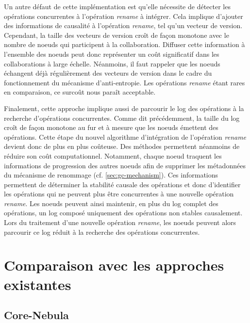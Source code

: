 \documentclass[12pt]{thesul}
\begin{document}
Un autre défaut de cette implémentation est qu'elle nécessite de détecter les opérations concurrentes à l'opération \emph{rename} à intégrer.
Cela implique d'ajouter des informations de causalité à l'opération \emph{rename}, tel qu'un vecteur de version.
Cependant, la taille des vecteurs de version croît de façon monotone avec le nombre de noeuds qui participent à la collaboration.
Diffuser cette information à l'ensemble des noeuds peut donc représenter un coût significatif dans les collaborations à large échelle.
Néanmoins, il faut rappeler que les noeuds échangent déjà régulièrement des vecteurs de version dans le cadre du fonctionnement du mécanisme d'anti-entropie.
Les opérations \emph{rename} étant rares en comparaison, ce surcoût nous paraît acceptable.

Finalement, cette approche implique aussi de parcourir le log des opérations à la recherche d'opérations concurrentes.
Comme dit précédemment, la taille du log croît de façon monotone au fur et à mesure que les noeuds émettent des opérations.
Cette étape du nouvel algorithme d'intégration de l'opération \emph{rename} devient donc de plus en plus coûteuse.
Des méthodes permettent néanmoins de réduire son coût computationnel.
Notamment, chaque noeud traquent les informations de progression des autres noeuds afin de supprimer les métadonnées du mécanisme de renommage (cf. \autoref{sec:gc-mechanism}).
Ces informations permettent de déterminer la stabilité causale des opérations et donc d'identifier les opérations qui ne peuvent plus être concurrentes à une nouvelle opération \emph{rename}.
Les noeuds peuvent ainsi maintenir, en plus du log complet des opérations, un log composé uniquement des opérations non stables causalement.
Lors du traitement d'une nouvelle opération \emph{rename}, les noeuds peuvent alors parcourir ce log réduit à la recherche des opérations concurrentes.


\section{Comparaison avec les approches existantes}

\subsection{Core-Nebula}
\end{document}
